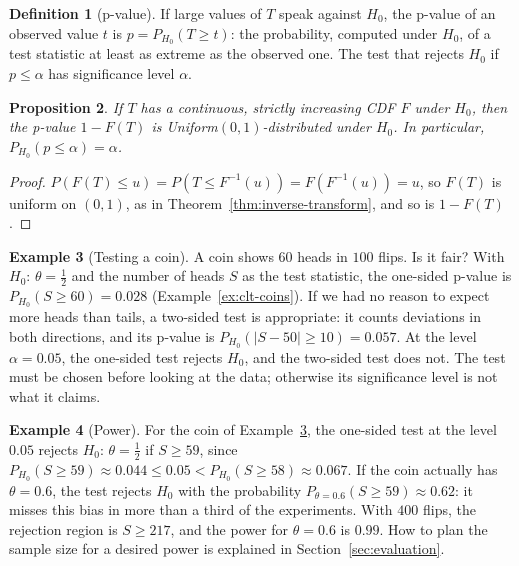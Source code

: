 \documentclass[11pt]{article}
\theoremstyle{definition}
\newtheorem{definition}{Definition}[section]
\newtheorem{example}[definition]{Example}
\theoremstyle{plain}
\newtheorem{proposition}[definition]{Proposition}
\theoremstyle{remark}
\begin{document}
\begin{definition}[p-value]\label{def:p-value}
    If large values of $T$ speak against $H_0$, the p-value of an observed value $t$ is $p = P_{H_0}(T \geq t)$: the probability, computed under $H_0$, of a test statistic at least as extreme as the observed one. The test that rejects $H_0$ if $p \leq \alpha$ has significance level $\alpha$.
\end{definition}

\begin{proposition}\label{prop:p-uniform}
    If $T$ has a continuous, strictly increasing CDF $F$ under $H_0$, then the p-value $1 - F(T)$ is Uniform$(0, 1)$-distributed under $H_0$. In particular, $P_{H_0}(p \leq \alpha) = \alpha$.
\end{proposition}

\begin{proof}
    $P(F(T) \leq u) = P(T \leq F^{-1}(u)) = F(F^{-1}(u)) = u$, so $F(T)$ is uniform on $(0, 1)$, as in Theorem~\ref{thm:inverse-transform}, and so is $1 - F(T)$.
\end{proof}

\begin{example}[Testing a coin]\label{ex:coin-test}
    A coin shows $60$ heads in $100$ flips. Is it fair? With $H_0$: $\theta = \frac{1}{2}$ and the number of heads $S$ as the test statistic, the one-sided p-value is $P_{H_0}(S \geq 60) = 0.028$ (Example~\ref{ex:clt-coins}). If we had no reason to expect more heads than tails, a two-sided test is appropriate: it counts deviations in both directions, and its p-value is $P_{H_0}(|S - 50| \geq 10) = 0.057$. At the level $\alpha = 0.05$, the one-sided test rejects $H_0$, and the two-sided test does not. The test must be chosen before looking at the data; otherwise its significance level is not what it claims.
\end{example}

\begin{example}[Power]\label{ex:power}
    For the coin of Example~\ref{ex:coin-test}, the one-sided test at the level $0.05$ rejects $H_0$: $\theta = \frac{1}{2}$ if $S \geq 59$, since $P_{H_0}(S \geq 59) \approx 0.044 \leq 0.05 < P_{H_0}(S \geq 58) \approx 0.067$. If the coin actually has $\theta = 0.6$, the test rejects $H_0$ with the probability $P_{\theta = 0.6}(S \geq 59) \approx 0.62$: it misses this bias in more than a third of the experiments. With $400$ flips, the rejection region is $S \geq 217$, and the power for $\theta = 0.6$ is $0.99$. How to plan the sample size for a desired power is explained in Section~\ref{sec:evaluation}.
\end{example}
\end{document}
